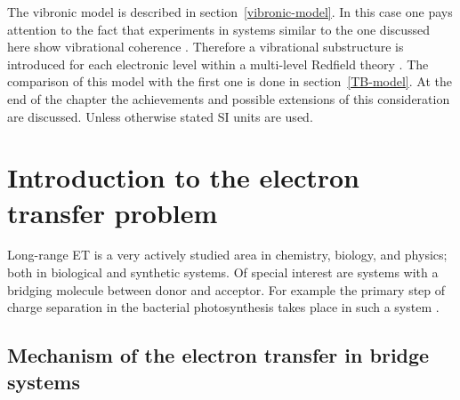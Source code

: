 \documentclass[12pt,twoside,a4paper]{report}
\begin{document}
The vibronic model is described in 
section~\ref{vibronic-model}. 
In this case 
one pays attention to the fact that experiments in systems similar to the 
one discussed here show vibrational coherence \cite{vos93,stan95}. Therefore 
a vibrational substructure is introduced for each electronic level within a 
multi-level Redfield theory \cite{may92,kueh94}. The comparison of this 
model with the first one is done in section~\ref{TB-model}. 
At the end of the chapter  the achievements and possible extensions 
of this consideration are 
discussed. Unless otherwise stated SI units are used. 
 
\section{Introduction \label{chem-intr}to the electron transfer problem} 
 
Long-range ET is a very actively studied area in 
chemistry, biology, and physics; both in biological and synthetic systems. 
Of special interest are systems with a bridging molecule between donor and 
acceptor. For example the primary step of charge separation in the bacterial 
photosynthesis takes place in  such a system \cite{bixo91}.%
  
\subsection{Mechanism of the electron transfer in bridge systems\label{mechanism}} 
\end{document}
